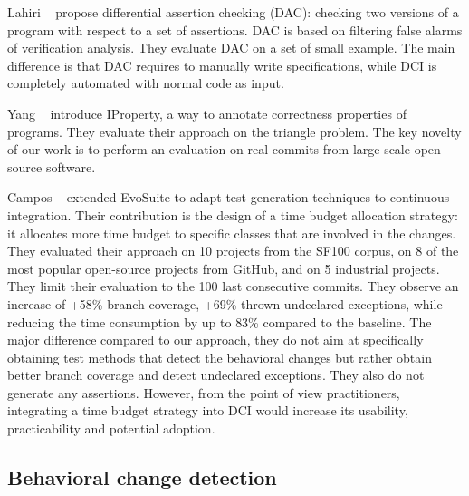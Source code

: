 Lahiri \etal~\cite{differential-assertion-checking} propose differential assertion checking (DAC): checking two versions of a program with respect to a set of assertions. DAC is based on filtering false alarms of verification analysis. They evaluate DAC on a set of small example.
The main difference is that DAC requires to manually write specifications, while DCI is completely automated with normal code as input.

Yang \etal~\cite{Yang:2014:PDI:2568225.2568319} introduce IProperty, a  way to annotate  correctness properties of programs. They evaluate their approach on the triangle problem.
The key novelty of our work is to perform an evaluation on real commits from large scale open source software.

Campos \etal~\cite{Campos:2014:CTG:2642937.2643002} extended EvoSuite to adapt test generation techniques to continuous integration.
Their contribution is the design of a time budget allocation strategy: it allocates more time budget to specific classes that are involved in the changes.
They evaluated their approach on 10 projects from the SF100 corpus, on 8 of the most popular open-source projects from GitHub, and on 5 industrial projects.
They limit their evaluation to the 100 last consecutive commits.
They observe an increase of +58\% branch coverage, +69\% thrown undeclared exceptions, while reducing the time consumption by up to 83\% compared to the baseline.
The major difference compared to our approach, they do not aim at specifically obtaining test methods that detect the behavioral changes but rather obtain better branch coverage and detect undeclared exceptions. They also do not generate any assertions.
However, from the point of view practitioners, integrating a time budget strategy into DCI would increase its usability, practicability and potential adoption.


\subsection{Behavioral change detection}

